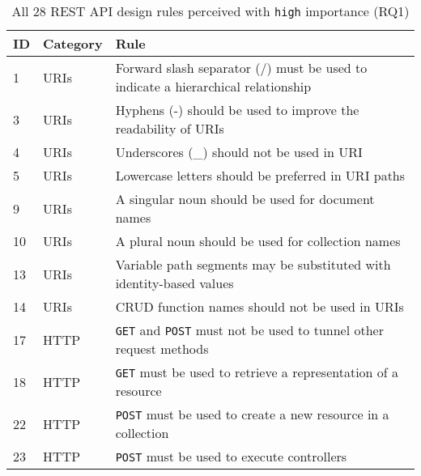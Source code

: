 \documentclass[runningheads]{llncs}
\begin{document}
\begin{table}
    \centering
	\caption{All 28 REST API design rules perceived with \texttt{high} importance (RQ1)}
	\label{table:rulesHigh}
	\begin{tabular}{p{}>{\raggedright}p{}>{\raggedright\arraybackslash}p{}}
		
ID & Category                    & Rule                                                                 \\
\hline
\hline
1  & URIs      & Forward slash separator (/) must be used to indicate a hierarchical relationship                           \\
3  & URIs      & Hyphens (-) should be used to improve the readability of URIs                                              \\
4  & URIs      & Underscores (\_) should not be used in URI                                                                 \\
5  & URIs      & Lowercase letters should be preferred in URI paths                                                         \\
9  & URIs      & A singular noun should be used for document names                                                          \\
10 & URIs      & A plural noun should be used for collection names                                                          \\
13 & URIs      & Variable path segments may be substituted with identity-based values                                       \\
14 & URIs      & CRUD function names should not be used in URIs                                                             \\
17 & HTTP      & \texttt{GET} and \texttt{POST} must not be used to tunnel other request methods                                              \\
18 & HTTP      & \texttt{GET} must be used to retrieve a representation of a resource                                                \\
22 & HTTP      & \texttt{POST} must be used to create a new resource in a collection                                                 \\
23 & HTTP      & \texttt{POST} must be used to execute controllers                                                                   \\

\end{tabular}
\end{table}
\end{document}
